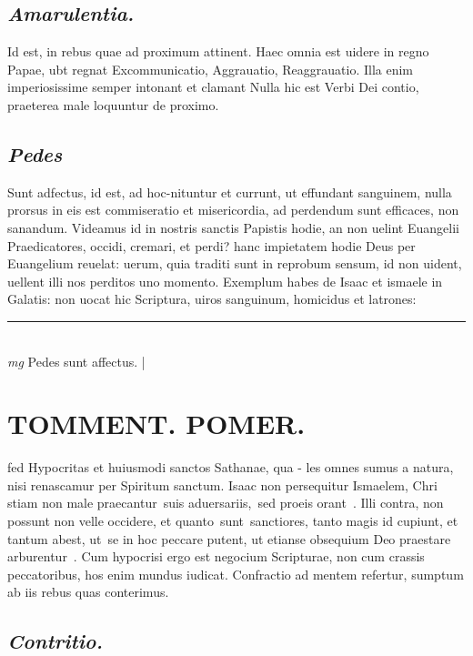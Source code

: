 \documentclass{article}
\begin{document}
\begin{pages}
\subsection*{\textit{Amarulentia. }}\pstart Id est, in rebus quae ad proximum attinent. Haec omnia est uidere in regno Papae, ubt regnat Excommunicatio, Aggrauatio, Reaggrauatio. Illa enim imperiosissime semper intonant et clamant Nulla hic est Verbi Dei contio, praeterea male loquuntur de proximo.  \pend
{}
{}
\subsection*{\textit{Pedes }}\pstart Sunt adfectus, id est, ad hoc-nituntur et currunt, ut effundant sanguinem, nulla prorsus in eis est commiseratio et misericordia, ad perdendum sunt efficaces, non sanandum. Videamus id in nostris sanctis Papistis hodie, an non uelint Euangelii Praedicatores, occidi, cremari, et perdi? hanc impietatem hodie Deus per Euangelium reuelat: uerum, quia traditi sunt in reprobum sensum, id non uident, uellent illi nos perditos uno momento. Exemplum habes de Isaac et ismaele in Galatis: non uocat hic Scriptura, uiros sanguinum, homicidus et latrones:  \pend
\vspace{0.5cm}\noindent
\vspace{0.2cm}\rule{1cm}{0.2pt}\\ 
\hspace{0.2cm}\textit{mg}
\footnotesize Pedes sunt affectus.  
\normalsize| 
\section*{TOMMENT. POMER.  }\pstart fed Hypocritas et huiusmodi sanctos Sathanae, qua - les omnes sumus a natura, nisi renascamur per Spiritum sanctum. Isaac non persequitur Ismaelem, Chri stiam non male praecantur suis aduersariis, sed proeis orant . Illi contra, non possunt non velle occidere, et quanto sunt sanctiores, tanto magis id cupiunt, et tantum abest, ut se in hoc peccare putent, ut etianse obsequium Deo praestare arburentur . Cum hypocrisi ergo est negocium Scripturae, non cum crassis peccatoribus, hos enim mundus iudicat.   \pend\pstart Confractio ad mentem refertur, sumptum ab iis rebus quas conterimus.   \pend
{}
{}
\subsection*{\textit{Contritio. }}
{}

\end{pages}
\end{document}
